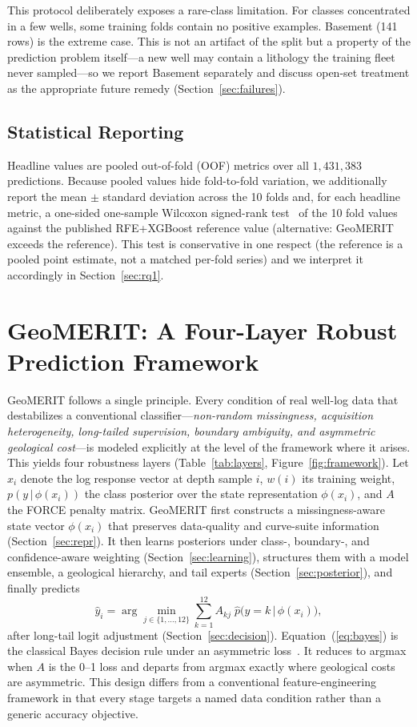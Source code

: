 \documentclass[bdcc,article,submit,pdftex,moreauthors]{Definitions/mdpi}
\begin{document}
This protocol deliberately exposes a rare-class limitation. For classes concentrated in a few
wells, some training folds contain no positive examples. Basement (141 rows) is the extreme
case. This is not an artifact of the split but a property of the prediction problem itself---a
new well may contain a lithology the training fleet never sampled---so we report Basement
separately and discuss open-set treatment as the appropriate future remedy
(Section~\ref{sec:failures}).

\subsection{Statistical Reporting}
\label{sec:stats}
Headline values are pooled out-of-fold (OOF) metrics over all $1{,}431{,}383$ predictions.
Because pooled values hide fold-to-fold variation, we additionally report the mean
$\pm$ standard deviation across the 10 folds and, for each headline metric, a one-sided
one-sample Wilcoxon signed-rank test~\cite{wilcoxon1945} of the 10 fold values against the
published RFE+XGBoost reference value (alternative: GeoMERIT exceeds the reference). This
test is conservative in one respect (the reference is a pooled point estimate, not a matched
per-fold series) and we interpret it accordingly in Section~\ref{sec:rq1}.

\section{GeoMERIT: A Four-Layer Robust Prediction Framework}
\label{sec:method}
GeoMERIT follows a single principle. Every condition of real well-log data that destabilizes
a conventional classifier---\emph{non-random missingness, acquisition heterogeneity,
long-tailed supervision, boundary ambiguity, and asymmetric geological cost}---is modeled
explicitly at the level of the framework where it arises. This
yields four robustness layers (Table~\ref{tab:layers}, Figure~\ref{fig:framework}). Let $x_i$
denote the log response vector at depth sample $i$, $w(i)$ its training weight,
$p(y\,|\,\phi(x_i))$ the class posterior over the state representation $\phi(x_i)$, and $A$
the FORCE penalty matrix. GeoMERIT first constructs a missingness-aware state vector
$\phi(x_i)$ that preserves data-quality and curve-suite information
(Section~\ref{sec:repr}). It then learns posteriors under class-, boundary-, and
confidence-aware weighting (Section~\ref{sec:learning}), structures them with a model
ensemble, a geological hierarchy, and tail experts (Section~\ref{sec:posterior}), and finally
predicts
\begin{equation}
\hat y_i = \arg\min_{j\in\{1,\ldots,12\}} \sum_{k=1}^{12} A_{kj}\;\hat p\!\bigl(y=k\,\big|\,\phi(x_i)\bigr),
\label{eq:bayes}
\end{equation}
after long-tail logit adjustment (Section~\ref{sec:decision}). Equation~(\ref{eq:bayes}) is
the classical Bayes decision rule under an asymmetric loss~\cite{berger1985decision}. It
reduces to argmax when $A$ is the 0--1 loss and departs from argmax exactly where
geological costs are asymmetric. This design differs from a conventional feature-engineering
framework in that every stage targets a named data condition rather than a generic accuracy
objective.
\end{document}
